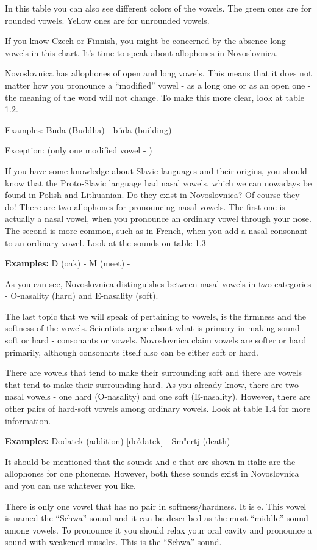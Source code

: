 In this table you can also see different colors of the vowels. The green ones are for rounded vowels. Yellow ones are for unrounded vowels.

If you know Czech or Finnish, you might be concerned by the absence long vowels in this chart. It’s time to speak about allophones in Novoslovnica.

Novoslovnica has allophones of open and long vowels. This means that it does not matter how you pronounce a “modified” vowel - as a long one or as an open one - the meaning of the word will not change. To make this more clear, look at table 1.2.


Examples:
Buda \textipa{[‘buda]} (Buddha) - búda \textipa{[‘bu:da]} (building) - \textipa{[‘bUda]}

Exception:  (only one modified vowel - )

If you have some knowledge about Slavic languages and their origins, you should know that the Proto-Slavic language had nasal vowels, which we can nowadays be found in Polish and Lithuanian. Do they exist in Novoslovnica? Of course they do! There are two allophones for pronouncing nasal vowels. The first one is actually a nasal vowel, when you pronounce an ordinary vowel through your nose. The second is more common, such as in French, when you add a nasal consonant \textipa{[N]} to an ordinary vowel. Look at the sounds on table 1.3


\textbf{Examples:}
D (oak) \textipa{[d\~{O}b]} - \textipa{[duNb]}
M (meet)\textipa{[‘m\~{E}so]} - \textipa{[`meNso]}

As you can see, Novoslovnica distinguishes between nasal vowels in two categories - O-nasality (hard) and E-nasality (soft). 

The last topic that we will speak of pertaining to vowels, is the firmness and the softness of the vowels. Scientists argue about what is primary in making sound soft or hard - consonants or vowels. Novoslovnica claim vowels are softer or hard primarily, although consonants itself also can be either soft or hard.

There are vowels that tend to make their surrounding soft and there are vowels that tend to make their surrounding hard. As you already know, there are two nasal vowels - one hard (O-nasality) and one soft (E-nasality). However, there are other pairs of hard-soft vowels among ordinary vowels. Look at table 1.4 for more information.



\textbf{Examples:}
Dodatek (addition) [do’datek] - Sm"ertj (death) \textipa{[sm\t{e}rt’]}

It should be mentioned that the sounds \textsc and e that are shown in italic are the allophones for one phoneme. However, both these sounds exist in Novoslovnica and you can use whatever you like.

There is only one vowel that has no pair in softness/hardness. It is e. This vowel is named the “Schwa” sound and it can be described as the most “middle” sound among vowels. To pronounce it you should relax your oral cavity and pronounce a sound with weakened muscles. This is the “Schwa” sound.



